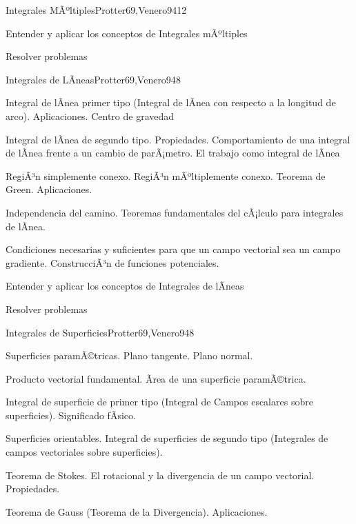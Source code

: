 \begin{syllabus}
\begin{unit}{Integrales MÃºltiples}{Protter69,Venero94}{12}
   \begin{unitgoals}
         \item  Entender y aplicar los conceptos de Integrales mÃºltiples
         \item  Resolver problemas
   \end{unitgoals}
\end{unit}

\begin{unit}{Integrales de LÃ­neas}{Protter69,Venero94}{8}
   \begin{topics}
	\item  Integral de lÃ­nea primer tipo (Integral de lÃ­nea con respecto a la longitud de arco). Aplicaciones. Centro de gravedad
	\item  Integral de lÃ­nea de segundo tipo. Propiedades. Comportamiento de una integral de lÃ­nea frente a un cambio de parÃ¡metro. El trabajo como integral de lÃ­nea
	\item  RegiÃ³n simplemente conexo. RegiÃ³n mÃºltiplemente conexo. Teorema de Green. Aplicaciones.
	\item  Independencia del camino. Teoremas fundamentales del cÃ¡lculo para integrales de lÃ­nea.
	\item Condiciones necesarias y suficientes para que un campo vectorial sea un campo gradiente. ConstrucciÃ³n de funciones potenciales.
   \end{topics}

   \begin{unitgoals}
         \item  Entender y aplicar los conceptos de Integrales de lÃ­neas
         \item  Resolver problemas
   \end{unitgoals}
\end{unit}

\begin{unit}{Integrales de Superficies}{Protter69,Venero94}{8}
   \begin{topics}
         \item  Superficies paramÃ©tricas. Plano tangente. Plano normal.
	 \item  Producto vectorial fundamental. Ãrea de una superficie paramÃ©trica.
         \item  Integral de superficie de primer tipo (Integral de Campos escalares sobre superficies). Significado fÃ­sico.
	 \item  Superficies orientables. Integral de superficies de segundo tipo (Integrales de campos vectoriales sobre superficies).
         \item  Teorema de Stokes. El rotacional y la divergencia de un campo vectorial. Propiedades.
         \item  Teorema de Gauss (Teorema de la Divergencia). Aplicaciones.
   \end{topics}


\end{unit}
\end{syllabus}
